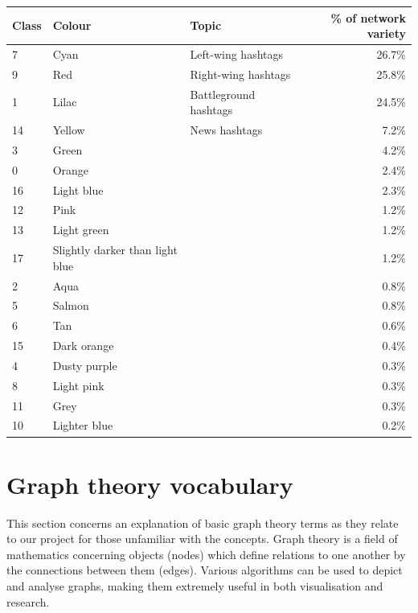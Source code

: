 \documentclass[a4paper,11pt]{article}  %
\begin{document}
\begin{appendices}
	\begin{center}
		\begin{tabular}{||l l l r||} 
			\hline
			Class & Colour & Topic & \% of network variety \\ [0.5ex] 
			\hline\hline
			7 & Cyan & Left-wing hashtags & 26.7\% \\ 
			\hline
			9 & Red & Right-wing hashtags & 25.8\% \\
			\hline
			1 & Lilac & Battleground hashtags & 24.5\% \\
			\hline
			14 & Yellow & News hashtags & 7.2\% \\
			\hline
			3 & Green &  & 4.2\% \\
			\hline
			0 & Orange &  & 2.4\% \\
			\hline
			16 & Light blue &  & 2.3\% \\
			\hline
			12 & Pink &  & 1.2\% \\
			\hline
			13 & Light green &  & 1.2\% \\
			\hline
			17 & Slightly darker than light blue &  & 1.2\% \\
			\hline
			2 & Aqua &  & 0.8\% \\
			\hline
			5 & Salmon &  & 0.8\% \\
			\hline
			6 & Tan &  & 0.6\% \\
			\hline
			15 & Dark orange &  & 0.4\% \\
			\hline
			4 & Dusty purple &  & 0.3\% \\
			\hline
			8 & Light pink &  & 0.3\% \\
			\hline
			11 & Grey &  & 0.3\% \\
			\hline
			10 & Lighter blue &  & 0.2\% \\
			\hline
		\end{tabular}
	\end{center}
	
	\section{Graph theory vocabulary}
	\label{app:networks}
	This section concerns an explanation of basic graph theory terms as they relate to our project for those unfamiliar with the concepts. Graph theory is a field of mathematics concerning objects (nodes) which define relations to one another by the connections between them (edges). Various algorithms can be used to depict and analyse graphs, making them extremely useful in both visualisation and research.
	

\end{appendices}
\end{document}
